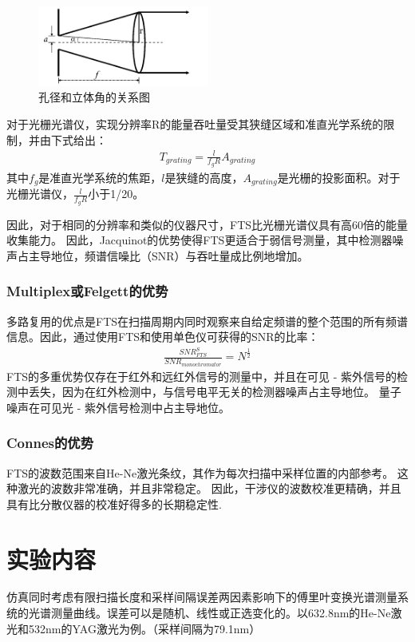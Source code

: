 \documentclass[conference]{IEEEtran}
\begin{document}
\begin{figure}[htbp]
    \centerline{\includegraphics[width=0.5\textwidth]{pic12.png}}
    \caption{孔径和立体角的关系图}
    \label{pic12}
\end{figure}

对于光栅光谱仪，实现分辨率R的能量吞吐量受其狭缝区域和准直光学系统的限制，并由下式给出：
\begin{align}
    T_{grating} = \frac{l}{f_gR}A_{grating}
\end{align}
其中$f_g$是准直光学系统的焦距，$l$是狭缝的高度，$A_{grating}$是光栅的投影面积。对于光栅光谱仪，$\frac{l}{f_gR}$小于1/20。

因此，对于相同的分辨率和类似的仪器尺寸，FTS比光栅光谱仪具有高60倍的能量收集能力。 因此，Jacquinot的优势使得FTS更适合于弱信号测量，其中检测器噪声占主导地位，频谱信噪比（SNR）与吞吐量成比例地增加。

\subsubsection{Multiplex或Felgett的优势} 
多路复用的优点是FTS在扫描周期内同时观察来自给定频谱的整个范围的所有频谱信息。因此，通过使用FTS和使用单色仪可获得的SNR的比率：
\begin{align}
    \frac{SNR^S_{FTS}}{SNR_{monochromator}} = N^{\frac{1}{2}}
\end{align}
FTS的多重优势仅存在于红外和远红外信号的测量中，并且在可见 - 紫外信号的检测中丢失，因为在红外检测中，与信号电平无关的检测器噪声占主导地位。 量子噪声在可见光 - 紫外信号检测中占主导地位。
\subsubsection{Connes的优势}
FTS的波数范围来自He-Ne激光条纹，其作为每次扫描中采样位置的内部参考。 这种激光的波数非常准确，并且非常稳定。 因此，干涉仪的波数校准更精确，并且具有比分散仪器的校准好得多的长期稳定性.


\section{实验内容}
仿真同时考虑有限扫描长度和采样间隔误差两因素影响下的傅里叶变换光谱测量系统的光谱测量曲线。误差可以是随机、线性或正选变化的。以632.8nm的He-Ne激光和532nm的YAG激光为例。（采样间隔为79.1nm）
\end{document}

